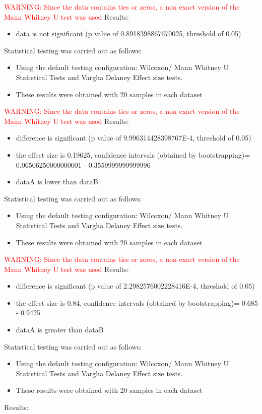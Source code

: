 \documentclass[]{article}
\begin{document}
\textcolor{Red}{WARNING: Since the data contains ties or zeros, a non exact version of the Mann Whitney U test was used
}
Results:
\begin{itemize}
\item{data is not significant (p value of 0.8918398867670025, threshold of 0.05)}
\end{itemize}Statistical testing was carried out as follows: \begin{itemize}
\item{Using the default testing configuration: Wilcoxon/ Mann Whitney U Statistical Tests and Vargha Delaney Effect size tests.}
\item{These results were obtained with 20 samples in each dataset}
\end{itemize}
\textcolor{Red}{WARNING: Since the data contains ties or zeros, a non exact version of the Mann Whitney U test was used
}
Results:
\begin{itemize}
\item{difference is significant (p value of 9.996314428398767E-4, threshold of 0.05)}
\item{the effect size is 0.19625, confidence intervals (obtained by bootstrapping)= 0.06506250000000001 - 0.3559999999999996}
\item{dataA is lower than dataB}
\end{itemize}Statistical testing was carried out as follows: \begin{itemize}
\item{Using the default testing configuration: Wilcoxon/ Mann Whitney U Statistical Tests and Vargha Delaney Effect size tests.}
\item{These results were obtained with 20 samples in each dataset}
\end{itemize}
\textcolor{Red}{WARNING: Since the data contains ties or zeros, a non exact version of the Mann Whitney U test was used
}
Results:
\begin{itemize}
\item{difference is significant (p value of 2.2982576002228416E-4, threshold of 0.05)}
\item{the effect size is 0.84, confidence intervals (obtained by bootstrapping)= 0.685 - 0.9425}
\item{dataA is greater than dataB}
\end{itemize}Statistical testing was carried out as follows: \begin{itemize}
\item{Using the default testing configuration: Wilcoxon/ Mann Whitney U Statistical Tests and Vargha Delaney Effect size tests.}
\item{These results were obtained with 20 samples in each dataset}
\end{itemize}Results:
\end{document}
